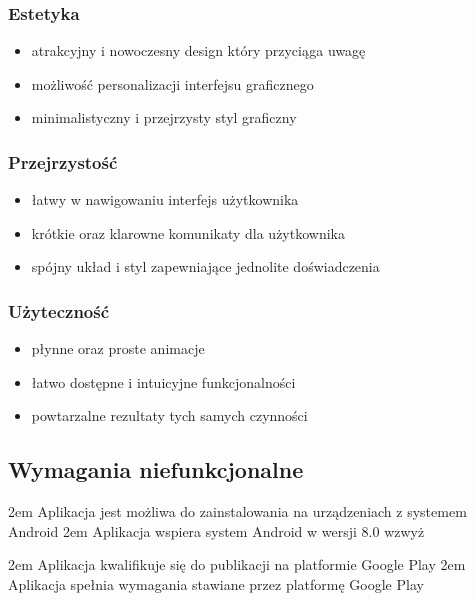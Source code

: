 \subsubsection{Estetyka}

\begin{itemize}[leftmargin=*]
    \item atrakcyjny i nowoczesny design który przyciąga uwagę
    \item możliwość personalizacji interfejsu graficznego
    \item minimalistyczny i przejrzysty styl graficzny
\end{itemize}

\subsubsection{Przejrzystość}

\begin{itemize}[leftmargin=*]
    \item łatwy w nawigowaniu interfejs użytkownika
    \item krótkie oraz klarowne komunikaty dla użytkownika
    \item spójny układ i styl zapewniające jednolite doświadczenia
\end{itemize}

\subsubsection{Użyteczność}

\begin{itemize}[leftmargin=*]
    \item płynne oraz proste animacje
    \item łatwo dostępne i intuicyjne funkcjonalności
    \item powtarzalne rezultaty tych samych czynności
\end{itemize}

\newpage

\subsection{Wymagania niefunkcjonalne}

{2em}{
    Aplikacja jest możliwa do zainstalowania na urządzeniach z systemem Android
}
{2em}{
    Aplikacja wspiera system Android w wersji 8.0 wzwyż
}

{2em}{
    Aplikacja kwalifikuje się do publikacji na platformie Google Play
}
{2em}{
    Aplikacja spełnia wymagania stawiane przez platformę Google Play
}

